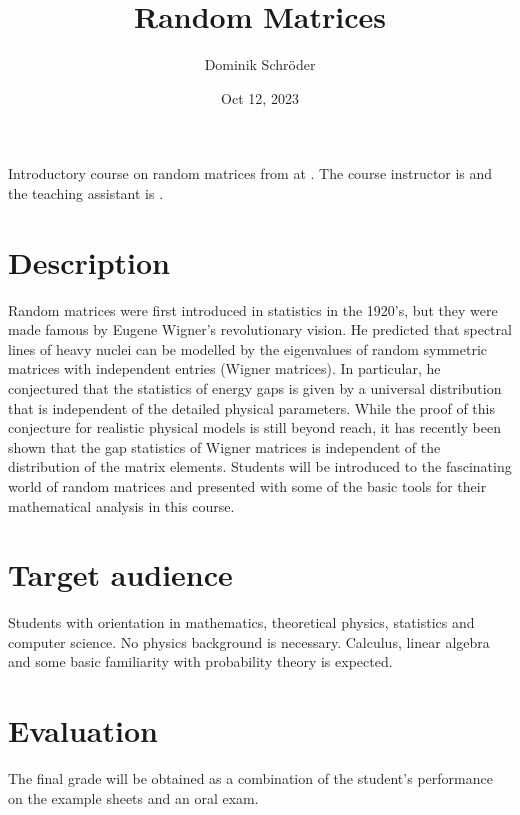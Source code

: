 \documentclass[letterpaper,10pt,english]{sphinxhowto}
\title{Random Matrices}
\date{Oct 12, 2023}
\author{Dominik Schröder}
\begin{document}
\pagestyle{empty}
\sphinxmaketitle
\pagestyle{plain}
\sphinxtableofcontents
\pagestyle{normal}
\label{\detokenize{teaching/random_matrices_2017::doc}}


\sphinxAtStartPar
Introductory course on random matrices from  at . The course instructor is  and the teaching assistant is .


\section{Description}
\label{\detokenize{teaching/random_matrices_2017:description}}
\sphinxAtStartPar
Random matrices were first introduced in statistics in the 1920’s, but they were made famous by Eugene Wigner’s revolutionary vision. He predicted that spectral lines of heavy nuclei can be modelled by the eigenvalues of random symmetric matrices with independent entries (Wigner matrices). In particular, he conjectured that the statistics of energy gaps is given by a universal distribution that is independent of the detailed physical parameters. While the proof of this conjecture for realistic physical models is still beyond reach, it has recently been shown that the gap statistics of Wigner matrices is independent of the distribution of the matrix elements. Students will be introduced to the fascinating world of random matrices and presented with some of the basic tools for their mathematical analysis in this course.


\section{Target audience}
\label{\detokenize{teaching/random_matrices_2017:target-audience}}
\sphinxAtStartPar
Students with orientation in mathematics, theoretical physics, statistics and computer science. No physics background is necessary. Calculus, linear algebra and some basic familiarity with probability theory is expected.


\section{Evaluation}
\label{\detokenize{teaching/random_matrices_2017:evaluation}}
\sphinxAtStartPar
The final grade will be obtained as a combination of the student’s performance on the example sheets and an oral exam.
\end{document}

